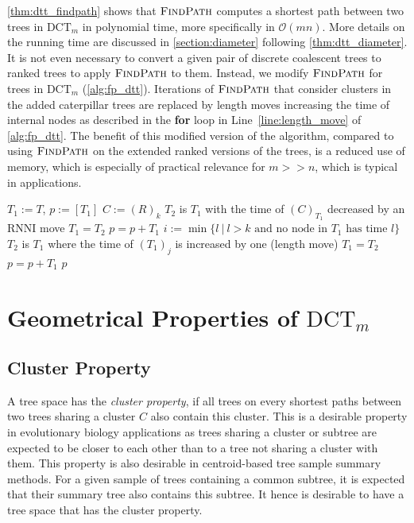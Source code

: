 \documentclass[11pt]{amsart}
\newcommand{\rnni}{\mathrm{RNNI}}
\newcommand{\findpath}{\textsc{FindPath}}
\newcommand{\ntime}{\mathrm{time}}
\newcommand{\dtt}{\mathrm{DCT}}
\renewcommand{\O}{\mathcal O}
\newcommand{\summary}[1]{} %
\begin{document}
\summary{Running time of $\findpath$ + we don't need to add subtree in practice}
\autoref{thm:dtt_findpath} shows that $\findpath$ computes a shortest path between two trees in $\dtt_m$ in polynomial time, more specifically in $\O(mn)$.
More details on the running time are discussed in \autoref{section:diameter} following \autoref{thm:dtt_diameter}.
It is not even necessary to convert a given pair of discrete coalescent trees to ranked trees to apply $\findpath$ to them.
Instead, we modify $\findpath$ for trees in $\dtt_m$ (\autoref{alg:fp_dtt}).
Iterations of $\findpath$ that consider clusters in the added caterpillar trees are replaced by length moves increasing the time of internal nodes as described in the \textbf{for} loop in Line~\ref{line:length_move} of \autoref{alg:fp_dtt}.
The benefit of this modified version of the algorithm, compared to using $\findpath$ on the extended ranked versions of the trees, is a reduced use of memory, which is especially of practical relevance for $m >> n$, which is typical in applications.

\begin{algorithm}[h]
	\caption{$\findpath$($T,R$)}
	\begin{algorithmic}[1]
		\label{alg:fp_dtt}
		\STATE $T_1 := T$, $p := [T_1]$
			\STATE $C:=(R)_k$
			\WHILE {$\ntime((C)_{T_1})>k$}
					\STATE $T_2$ is $T_1$ with the time of $(C)_{T_1}$ decreased by an $\rnni$ move
				\STATE $T_1 = T_2$
				\STATE $p = p+T_1$
			\ENDWHILE
				\STATE $i := \min\{l \ |\  l>k \text{ and no node in } T_1 \text{ has time }l\}$
					\label{line:length_move}
					\STATE $T_2$ is $T_1$ where the time of $(T_1)_j$ is increased by one (length move)
					\STATE $T_1 = T_2$
					\STATE $p = p+T_1$
				\ENDFOR
			\ENDIF
		\ENDFOR
		\RETURN $p$
	\end{algorithmic}
\end{algorithm}


\section{Geometrical Properties of $\dtt_m$}
\label{section:geometry}

\subsection{Cluster Property}
\label{section:cluster_property}
\summary{Definition of Cluster Property and why it is relevant (a bit of bio).}
A tree space has the \emph{cluster property}, if all trees on every shortest paths between two trees sharing a cluster $C$ also contain this cluster.
This is a desirable property in evolutionary biology applications as trees sharing a cluster or subtree are expected to be closer to each other than to a tree not sharing a cluster with them.
This property is also desirable in centroid-based tree sample summary methods.
For a given sample of trees containing a common subtree, it is expected that their summary tree also contains this subtree.
It hence is desirable to have a tree space that has the cluster property.
\end{document}
